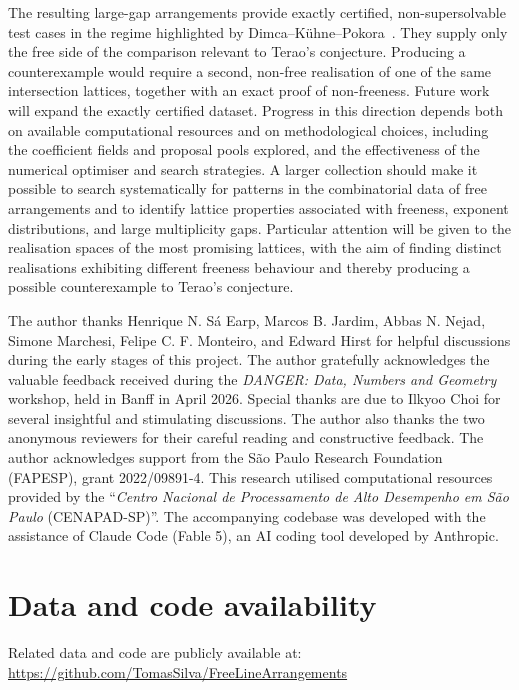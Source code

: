 \documentclass[pdflatex,sn-mathphys-num]{sn-jnl}%
\theoremstyle{remark}
\theoremstyle{definition}
\begin{document}
The resulting large-gap arrangements provide exactly certified, non-supersolvable test cases in the regime highlighted by Dimca--K\"uhne--Pokora~\cite{Dimca2026freelinearrangementslow}. They supply only the free side of the comparison relevant to Terao's conjecture. Producing a counterexample would require a second, non-free realisation of one of the same intersection lattices, together with an exact proof of non-freeness. Future work will expand the exactly certified dataset. Progress in this direction depends both on available computational resources and on methodological choices, including the coefficient fields and proposal pools explored, and the effectiveness of the numerical optimiser and search strategies. A larger collection should make it possible to search systematically for patterns in the combinatorial data of free arrangements and to identify lattice properties associated with freeness, exponent distributions, and large multiplicity gaps. Particular attention will be given to the realisation spaces of the most promising lattices, with the aim of finding distinct realisations exhibiting different freeness behaviour and thereby producing a possible counterexample to Terao's conjecture.



\medskip
{}

The author thanks Henrique N. Sá Earp, Marcos B. Jardim, Abbas N. Nejad, Simone Marchesi, Felipe C. F. Monteiro, and Edward Hirst for helpful discussions during the early stages of this project. The author gratefully acknowledges the valuable feedback received during the \emph{DANGER: Data, Numbers and Geometry} workshop, held in Banff in April 2026. Special thanks are due to Ilkyoo Choi for several insightful and stimulating discussions. The author also thanks the two anonymous reviewers for their careful reading and constructive feedback. The author acknowledges support from the São Paulo Research Foundation (FAPESP), grant 2022/09891-4. This research utilised computational resources provided by the ``\emph{Centro Nacional de Processamento de Alto Desempenho em São Paulo} (CENAPAD-SP)''. The accompanying codebase was developed with the assistance of Claude Code (Fable 5), an AI coding tool developed by Anthropic.

\section*{Data and code availability}
Related data and code are publicly available at: \url{https://github.com/TomasSilva/FreeLineArrangements}
\end{document}
